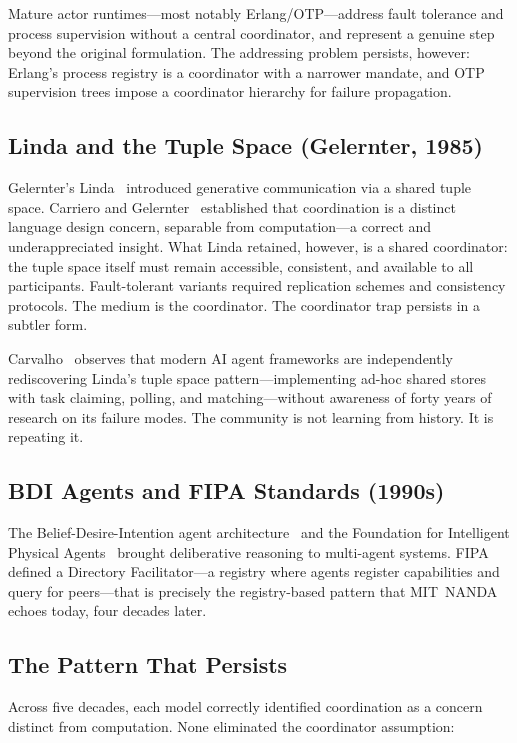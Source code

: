 \documentclass[11pt]{article}
\begin{document}
Mature actor runtimes---most notably Erlang/OTP---address fault tolerance and
process supervision without a central coordinator, and represent a genuine step
beyond the original formulation. The addressing problem persists, however:
Erlang's process registry is a coordinator with a narrower mandate, and OTP
supervision trees impose a coordinator hierarchy for failure propagation.

\subsection{Linda and the Tuple Space (Gelernter, 1985)}

Gelernter's Linda~\cite{linda} introduced generative communication via a shared
tuple space. Carriero and Gelernter~\cite{linda-coord} established that
coordination is a distinct language design concern, separable from
computation---a correct and underappreciated insight. What Linda retained,
however, is a shared coordinator: the tuple space itself must remain accessible,
consistent, and available to all participants. Fault-tolerant variants required
replication schemes and consistency protocols. The medium is the coordinator. The
coordinator trap persists in a subtler form.

Carvalho~\cite{carvalho} observes that modern AI agent frameworks are
independently rediscovering Linda's tuple space pattern---implementing ad-hoc
shared stores with task claiming, polling, and matching---without awareness of
forty years of research on its failure modes. The community is not learning from
history. It is repeating it.

\subsection{BDI Agents and FIPA Standards (1990s)}

The Belief-Desire-Intention agent architecture~\cite{bdi} and the Foundation for
Intelligent Physical Agents~\cite{fipa,jade} brought deliberative reasoning to
multi-agent systems. FIPA defined a Directory Facilitator---a registry where
agents register capabilities and query for peers---that is precisely the
registry-based pattern that MIT~NANDA echoes today, four decades later.

\subsection{The Pattern That Persists}

Across five decades, each model correctly identified coordination as a concern
distinct from computation. None eliminated the coordinator assumption:
\end{document}
